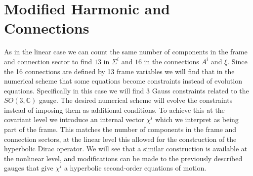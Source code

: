 \documentclass[10pt]{report}
\theoremstyle{definition}
\newcommand{\C}[0]{\mathbb{C}}
\begin{document}
        \section{Modified Harmonic and Connections} \label{sec:nonlin-modified-gauge-fixing}
        As in the linear case we can count the same number of components in the frame and connection sector to find $13$ in $\Sigma^i$ and $16$ in the connections $A^i$ and $\xi$. Since the 16 connections are defined by 13 frame variables we will find that in the numerical scheme that some equations become constraints instead of evolution equations. Specifically in this case we will find 3 Gauss constraints related to the $SO(3,\C)$ gauge. The desired numerical scheme will evolve the constraints instead of imposing them as additional conditions. To achieve this at the covariant level we introduce an internal vector $\chi^i$ which we interpret as being part of the frame. This matches the number of components in the frame and connection sectors, at the linear level this allowed for the construction of the hyperbolic Dirac operator. We will see that a similar construction is available at the nonlinear level, and modifications can be made to the previously described gauges that give $\chi^i$ a hyperbolic second-order equations of motion.
        
\end{document}
